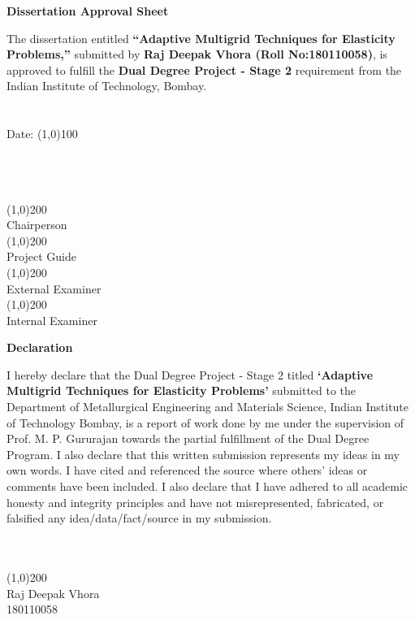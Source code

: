 \documentclass[12pt, a4paper]{report}
\begin{document}
\newpage
\begin{center}
    \vspace{10mm}
    \Large \textbf{Dissertation Approval Sheet}
\end{center}
The dissertation entitled \textbf{“Adaptive Multigrid Techniques for Elasticity Problems,”} submitted by \textbf{Raj Deepak Vhora (Roll No:180110058)}, is approved to fulfill the \textbf{Dual Degree Project - Stage 2} requirement from the Indian Institute of Technology, Bombay.
\\
\\
\\
\noindent
Date: \line(1,0){100} \\
\noindent
\\
\\
\\
\begin{FlushRight}
    \line(1,0){200} \\Chairperson\\
    \vspace{30mm}
    \line(1,0){200} \\Project Guide\\
    \vspace{30mm}
    \line(1,0){200} \\External Examiner\\
    \vspace{30mm}
    \line(1,0){200} \\Internal Examiner 
\end{FlushRight}

\cleardoublepage
\thispagestyle{empty}
\addtocounter{page}{-1}%
\mbox{}

\newpage
\begin{center}
    \Large \textbf{Declaration}
\end{center}

I hereby declare that the Dual Degree Project - Stage 2 titled \textbf{‘Adaptive Multigrid Techniques for Elasticity Problems’} submitted to the Department of Metallurgical Engineering and Materials Science, Indian Institute of Technology Bombay, is a report of work done by me under the supervision of Prof. M. P. Gururajan towards the partial fulfillment of the Dual Degree Program. I also declare that this written submission represents my ideas in my own words. I have cited and referenced the source where others’ ideas or comments have been included. I also 
declare that I have adhered to all academic honesty and integrity principles and have not 
misrepresented, fabricated, or falsified any idea/data/fact/source in my submission.
\\
\\
\\
\begin{FlushRight}
    \line(1,0){200} \\Raj Deepak Vhora\\ 180110058\\   
\end{FlushRight}
\end{document}
